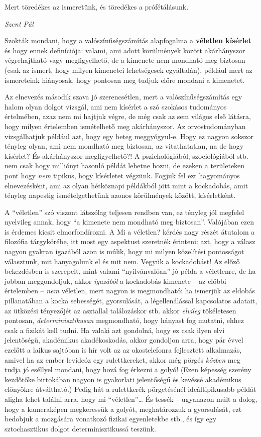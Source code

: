 \documentclass[magyar,]{book}
\begin{document}
\epigraph{Mert töredékes az ismeretünk, és töredékes a prófétálásunk.}{\textit{Szent Pál}}

Szokták mondani, hogy a valószínűségszámítás alapfogalma a \textbf{véletlen kísérlet} és hogy ennek definíciója: valami, ami adott körülmények között akárhányszor végrehajtható vagy megfigyelhető, de a kimenete nem mondható meg biztosan (csak az ismert, hogy milyen kimenetei lehetségesek egyáltalán), például mert az ismereteink hiányosak, hogy pontosan meg tudjuk előre mondani a kimenetet.

Az elnevezés második szava jó szerencsétlen, mert a valószínűségszámítás egy halom olyan dolgot vizsgál, ami nem kísérlet a szó szokásos tudományos értelmében, azaz nem mi hajtjuk végre, de még csak az sem világos első látásra, hogy milyen értelemben ismételhető meg akárhányszor. Az orvostudományban vizsgálhatjuk például azt, hogy egy beteg meggyógyul-e. Hogy ez nagyon sokszor tényleg olyan, ami nem mondható meg biztosan, az vitathatatlan, na de hogy kísérlet? És akárhányszor megfigyelhető?! A pszichológiából, szociológiából stb. nem csak hogy milliónyi hasonló példát lehetne hozni, de ezeken a területeken pont hogy \emph{nem} tipikus, hogy kísérletet végzünk. Fogjuk fel ezt hagyományos elnevezésként, ami az olyan hétköznapi példákból jött mint a kockadobás, amit tényleg napestig ismételgethetünk azonos körülmények között, kísérletként.

A \enquote{véletlen} szó viszont látszólag teljesen rendben van, ez tényleg jól megfelel nyelvileg annak, hogy \enquote{a kimenete nem mondható meg biztosan}. Valójában ezen is érdemes kicsit elmorfondírozni. A Mi a véletlen? kérdés nagy részét átutalom a filozófia tárgykörébe, itt most egy aspektust szeretnék érinteni: azt, hogy a válasz nagyon gyakran igazából azon is múlik, hogy mi milyen közelítési pontosságot választunk, mit hanyagolunk el és mit nem. Vegyük a kockadobást! Az előző bekezdésben is szerepelt, mint valami \enquote{nyilvánvalóan} jó példa a véletlenre, de ha jobban meggondoljuk, akkor \emph{igazából} a kockadobás kimenete -- az előbbi értelemben -- \emph{nem} véletlen, mert nagyon is megmondható: ha ismerjük az eldobás pillanatában a kocka sebességét, gyorsulását, a légellenálással kapcsolatos adatait, az ütközési tényezőjét az asztallal találozáskor stb. akkor \emph{elvileg} tökéletesen pontosan, \emph{determinisztikusan} megmondható, hogy hányast fog mutatni, ehhez csak a fizikát kell tudni. Ha valaki azt gondolná, hogy ez csak ilyen elvi jelentőségű, akadémikus akadékoskodás, akkor gondoljon arra, hogy pár évvel ezelőtt a laikus sajtóban is hír volt az az okostelefonra fejlesztett alkalmazás, amivel ha az ember levideóz egy rulettkereket, akkor még pörgés \emph{közben} meg tudja jó eséllyel mondani, hogy hová fog érkezni a golyó! (Ezen képesség szerény kezdőtőke birtokában nagyon is gyakorlati jelentőségű és kevéssé akadémikus előnyökre átváltható.) Pedig hát a rulettkerék pörgetésénél ideáltipikusabb példát aligha lehet találni arra, hogy mi \enquote{véletlen}\ldots{} És tessék -- ugyanazon múlt a dolog, hogy a kameraképen megkeressük a golyót, meghatározzuk a gyorsulását, ezt bedobjuk a mozgására vonatkozó fizikai egyenletekbe stb., és így egy sztochasztikus dolgot determinisztikussá teszünk.
\end{document}
